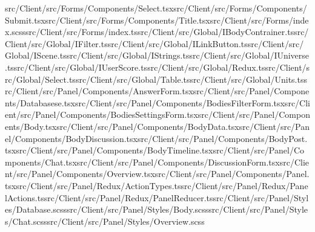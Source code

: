 \documentclass[a4paper,12pt]{article}
\begin{document}
src/Client/src/Forms/Components/Select.tsx\newline src/Client/src/Forms/Components/Submit.tsx\newline src/Client/src/Forms/Components/Title.tsx\newline src/Client/src/Forms/index.scss\newline src/Client/src/Forms/index.ts\newline src/Client/src/Global/IBodyContrainer.ts\newline src/Client/src/Global/IFilter.ts\newline src/Client/src/Global/ILinkButton.ts\newline src/Client/src/Global/IScene.ts\newline src/Client/src/Global/IStrings.ts\newline src/Client/src/Global/IUniverse.ts\newline src/Client/src/Global/IUserScore.ts\newline src/Client/src/Global/Redux.ts\newline src/Client/src/Global/Select.ts\newline src/Client/src/Global/Table.ts\newline src/Client/src/Global/Units.ts\newline src/Client/src/Panel/Components/AnswerForm.tsx\newline src/Client/src/Panel/Components/Databasese.tsx\newline src/Client/src/Panel/Components/BodiesFilterForm.tsx\newline src/Client/src/Panel/Components/BodiesSettingsForm.tsx\newline src/Client/src/Panel/Components/Body.tsx\newline src/Client/src/Panel/Components/BodyData.tsx\newline src/Client/src/Panel/Components/BodyDiscussion.tsx\newline src/Client/src/Panel/Components/BodyPost.tsx\newline src/Client/src/Panel/Components/BodyTimeline.tsx\newline src/Client/src/Panel/Components/Chat.tsx\newline src/Client/src/Panel/Components/DiscussionForm.tsx\newline src/Client/src/Panel/Components/Overview.tsx\newline src/Client/src/Panel/Components/Panel.tsx\newline src/Client/src/Panel/Redux/ActionTypes.ts\newline src/Client/src/Panel/Redux/PanelActions.ts\newline src/Client/src/Panel/Redux/PanelReducer.ts\newline src/Client/src/Panel/Styles/Database.scss\newline src/Client/src/Panel/Styles/Body.scss\newline src/Client/src/Panel/Styles/Chat.scss\newline src/Client/src/Panel/Styles/Overview.scss\newline 
\end{document}
